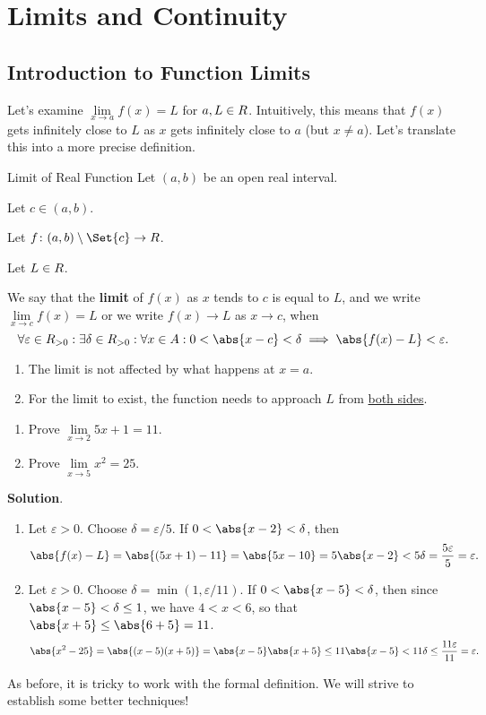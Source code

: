 \chapter{Limits and Continuity}
\section{Introduction to Function Limits}
Let's examine $ \lim\limits_{{x} \to {a}}f(x)=L $ for $ a,L\in\relax{R} $.
Intuitively, this means that $ f(x) $ gets infinitely close to $ L $
as $ x $ gets infinitely close to $ a $ (but $ x\ne a $). Let's translate this
into a more precise definition.
\begin{Definition}{Limit of Real Function}{}
    Let $ (a,b) $ be an open real interval.\smallskip

    Let $ c\in(a,b) $.\smallskip

    Let $ f\colon (a,b)\setminus\Set{c}\to\R $.\smallskip

    Let $ L\in\relax{R} $.\smallskip

    We say that the \textbf{limit} of $ f(x) $ as $ x $ tends to $ c $ is equal to $ L $,
    and we write $ \lim\limits_{{x} \to {c}}f(x)=L $ or we write $ f(x)\to L $ as $ x\to c $, when
    \[ \forall \varepsilon\in\R_{>0}:\exists \delta\in\R_{>0}:\forall x\in A: 0<\abs{x-c}<\delta\implies \abs{f(x)-L}<\varepsilon. \]
\end{Definition}
\begin{Remark}{}{}
    \begin{enumerate}[(1)]
        \item The limit is not affected by what happens at $ x=a $.
        \item For the limit to exist, the function needs to approach $ L $ from \underline{both sides}.
    \end{enumerate}
\end{Remark}
\begin{Example}{}{}
    \begin{enumerate}[(1)]
        \item Prove $ \lim\limits_{{x} \to {2}}5x+1=11 $.
        \item Prove $ \lim\limits_{{x} \to {5}}x^2=25 $.
    \end{enumerate}
    \tcblower{}
    \textbf{Solution}.
    \begin{enumerate}[(1)]
        \item Let $ \varepsilon>0 $. Choose $ \delta=\varepsilon/5 $. If $ 0<\abs{x-2}<\delta $, then
              \[ \abs{f(x)-L}=\abs{(5x+1)-11}=\abs{5x-10}=5\abs{x-2}<5\delta=\frac{5\varepsilon}{5}=\varepsilon. \]
        \item Let $ \varepsilon>0 $. Choose $ \delta=\min(1,\varepsilon/11) $. If $ 0<\abs{x-5}<\delta $, then
              since $ \abs{x-5}<\delta\le 1 $, we have $ 4<x<6 $, so that
              $ \abs{x+5}\le \abs{6+5}=11 $.
              \[ \abs{x^2-25}=\abs{(x-5)(x+5)}=\abs{x-5}\abs{x+5}\le 11\abs{x-5}<11\delta\le \frac{11\varepsilon}{11}=\varepsilon. \]
    \end{enumerate}
\end{Example}
As before, it is tricky to work with the formal definition. We will strive to establish some better techniques!

